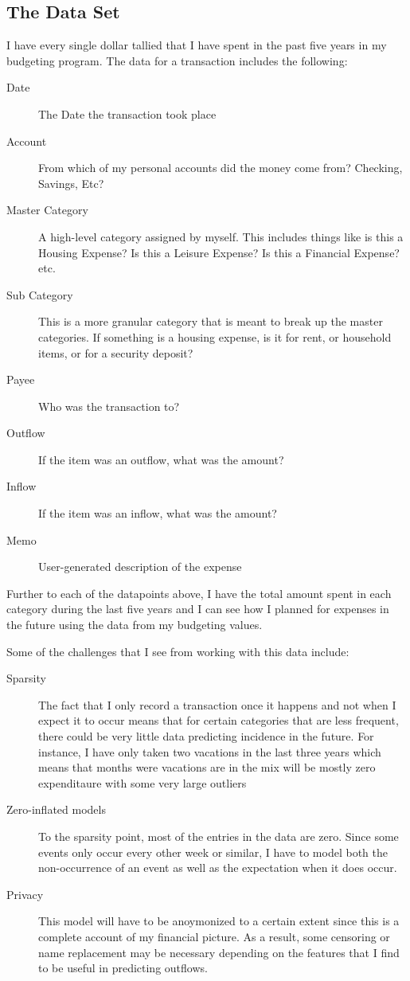 \documentclass[11pt,a4paper]{article}
\begin{document}
\subsection{The Data Set}
I have every single dollar tallied that I have spent in the past five years in my budgeting program. The data for a transaction includes the following:
\begin{description}
	\item[Date] The Date the transaction took place
	\item[Account] From which of my personal accounts did the money come from? Checking, Savings, Etc?
	\item[Master Category] A high-level category assigned by myself. This includes things like is this a Housing Expense? Is this a Leisure Expense? Is this a Financial Expense? etc.
	\item[Sub Category] This is a more granular category that is meant to break up the master categories. If something is a housing expense, is it for rent, or household items, or for a security deposit?
	\item[Payee] Who was the transaction to?
	\item[Outflow] If the item was an outflow, what was the amount?
	\item[Inflow] If the item was an inflow, what was the amount?
	\item[Memo] User-generated description of the expense
\end{description}

Further to each of the datapoints above, I have the total amount spent in each category during the last five years and I can see how I planned for expenses in the future using the data from my budgeting values. 

Some of the challenges that I see from working with this data include:
\begin{description}
	\item[Sparsity] The fact that I only record a transaction once it happens and not when I expect it to occur means that for certain categories that are less frequent, there could be very little data predicting incidence in the future. For instance, I have only taken two vacations in the last three years which means that months were vacations are in the mix will be mostly zero expenditaure with some very large outliers
	\item[Zero-inflated models] To the sparsity point, most of the entries in the data are zero. Since some events only occur every other week or similar, I have to model both the non-occurrence of an event as well as the expectation when it does occur.
	\item[Privacy] This model will have to be anoymonized to a certain extent since this is a complete account of my financial picture. As a result, some censoring or name replacement may be necessary depending on the features that I find to be useful in predicting outflows.
\end{description}
\end{document}

